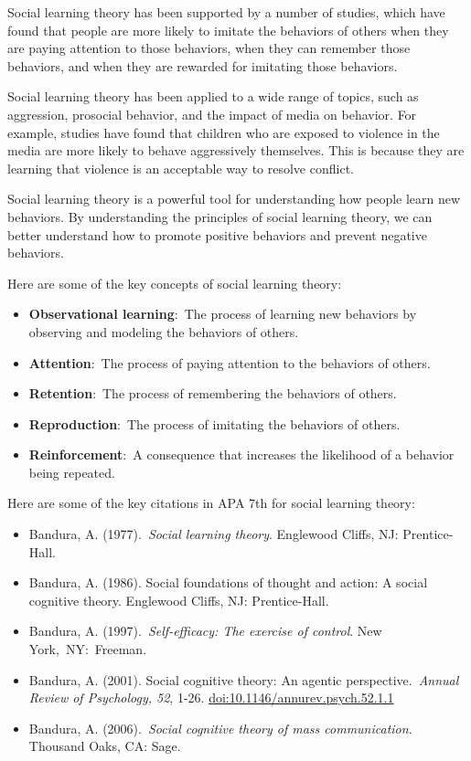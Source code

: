 \documentclass[
  b5paper]{book}
\begin{document}
Social learning theory has been supported by a number of studies, which have found that people are more likely to imitate the behaviors of others when they are paying attention to those behaviors, when they can remember those behaviors, and when they are rewarded for imitating those behaviors.

Social learning theory has been applied to a wide range of topics, such as aggression, prosocial behavior, and the impact of media on behavior. For example, studies have found that children who are exposed to violence in the media are more likely to behave aggressively themselves. This is because they are learning that violence is an acceptable way to resolve conflict.

Social learning theory is a powerful tool for understanding how people learn new behaviors. By understanding the principles of social learning theory, we can better understand how to promote positive behaviors and prevent negative behaviors.

Here are some of the key concepts of social learning theory:

\begin{itemize}
\item
  \textbf{Observational learning}:~The process of learning new behaviors by observing and modeling the behaviors of others.
\item
  \textbf{Attention}:~The process of paying attention to the behaviors of others.
\item
  \textbf{Retention}:~The process of remembering the behaviors of others.
\item
  \textbf{Reproduction}:~The process of imitating the behaviors of others.
\item
  \textbf{Reinforcement}:~A consequence that increases the likelihood of a behavior being repeated.
\end{itemize}

Here are some of the key citations in APA 7th for social learning theory:

\begin{itemize}
\item
  Bandura, A. (1977).~\emph{Social learning theory}. Englewood Cliffs, NJ: Prentice-Hall.
\item
  Bandura, A. (1986). Social foundations of thought and action: A social cognitive theory. Englewood Cliffs, NJ: Prentice-Hall.
\item
  Bandura, A. (1997).~\emph{Self-efficacy: The exercise of control}. New York,~NY:~Freeman.
\item
  Bandura, A. (2001). Social cognitive theory: An agentic perspective.~\emph{Annual Review of Psychology, 52}, 1-26. \url{doi:10.1146/annurev.psych.52.1.1}
\item
  Bandura, A. (2006).~\emph{Social cognitive theory of mass communication}. Thousand Oaks, CA: Sage.
\end{itemize}
\end{document}
